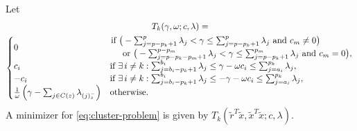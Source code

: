 \begin{theorem}
  \label{thm:slope-thresholding}
  Let
  \begin{multline*}
    T_k(\gamma, \omega; c, \lambda) = \\
    \begin{cases}
        0                                                                      &
        \splitfrac{
          \text{if } \big(-\sum_{j = p - p_k + 1}^p \lambda_j < \gamma \leq \sum_{j = p - p_k + 1}^p \lambda_j
          \text{ and } c_m \neq 0\big)
        }{%
          \text{ or } \big(  -\sum_{j = p - p_k - p_m + 1}^{p - p_m} \lambda_j < \gamma \leq \sum_{j = p - p_k + 1}^{p_m} \lambda_j \text{ and } c_m = 0\big),
        }                                                                                                                                                                                                              \\
        c_i                                                                    & \text{if } \exists\, i \neq k: \sum_{j = b_i - p_k + 1}^{b_i} \lambda_j \leq \gamma - \omega c_i \leq \sum_{j = a_i}^{p_k} \lambda_j,    \\
        -c_i                                                                   & \text{if } \exists\, i \neq k : \sum_{j = b_i - p_k + 1}^{b_i} \lambda_j \leq - \gamma - \omega c_i \leq \sum_{j = a_i}^{p_k} \lambda_j, \\
        \frac{1}{\omega}\left(\gamma - \sum_{j \in C(z)} \lambda_{(j)^-_z}\right) & \text{otherwise.}                                                                                                                     \\
      \end{cases}
  \end{multline*}
  A minimizer for \eqref{eq:cluster-problem} is given by \(T_k(\tilde{r}^T\tilde{x}, \tilde{x}^T\tilde{x}; c, \lambda)\).
\end{theorem}
